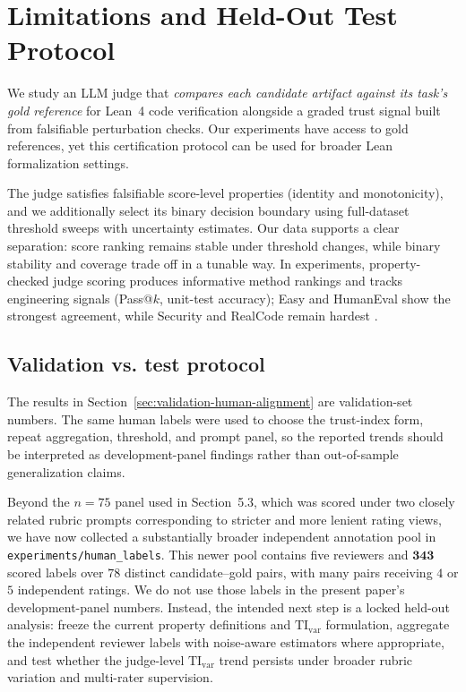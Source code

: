 \documentclass{article}
\begin{document}
\section{Limitations and Held-Out Test Protocol}
We study an LLM judge that \emph{compares each candidate artifact against its task's gold reference} for Lean~4 code verification alongside a graded trust signal built from falsifiable perturbation checks. Our experiments have access to gold references, yet this certification protocol can be used for broader Lean formalization settings.

The judge satisfies falsifiable score-level properties (identity and monotonicity), and we additionally select its binary decision boundary using full-dataset threshold sweeps with uncertainty estimates.
Our data supports a clear separation: score ranking remains stable under threshold changes, while binary stability and coverage trade off in a tunable way.
In experiments, property-checked judge scoring produces informative method rankings and tracks engineering signals (Pass@$k$, unit-test accuracy); Easy and HumanEval show the strongest agreement, while Security and RealCode remain hardest \citep{chen2021evaluating}.

\subsection{Validation vs. test protocol}
The results in Section~\ref{sec:validation-human-alignment} are validation-set numbers. The same human labels were used to choose the trust-index form, repeat aggregation, threshold, and prompt panel, so the reported trends should be interpreted as development-panel findings rather than out-of-sample generalization claims.

Beyond the \(n=75\) panel used in Section~5.3, which was scored under two closely related rubric prompts corresponding to stricter and more lenient rating views, we have now collected a substantially broader independent annotation pool in \texttt{experiments/human\_labels}. This newer pool contains five reviewers and \(\mathbf{343}\) scored labels over \(78\) distinct candidate--gold pairs, with many pairs receiving \(4\) or \(5\) independent ratings. We do not use those labels in the present paper's development-panel numbers. Instead, the intended next step is a locked held-out analysis: freeze the current property definitions and \(\mathrm{TI}_{\mathrm{var}}\) formulation, aggregate the independent reviewer labels with noise-aware estimators where appropriate, and test whether the judge-level \(\mathrm{TI}_{\mathrm{var}}\) trend persists under broader rubric variation and multi-rater supervision.
\end{document}

